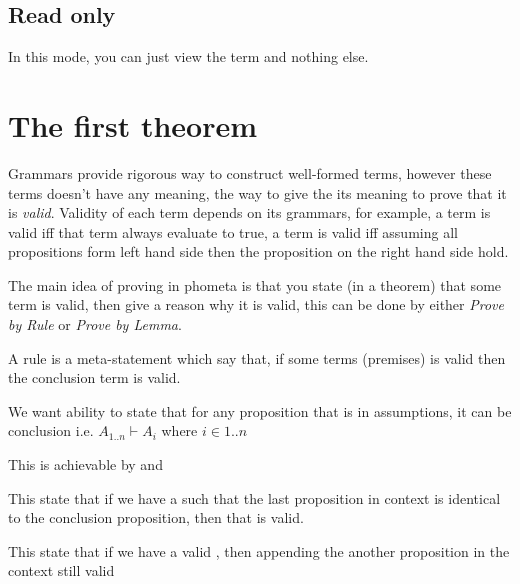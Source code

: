 \documentclass[master.tex]{subfiles}
\begin{document}
\subsection{Read only}
In this mode, you can just view the term and nothing else.

\section{The first theorem}

Grammars provide rigorous way to construct well-formed terms, however these
terms doesn't have any meaning, the way to give the its meaning to prove that it
is \emph{valid}. Validity of each term depends on its grammars, for example,
a  term is valid iff that term always evaluate to true, a
 term is valid iff assuming all propositions form left hand
side then the proposition on the right hand side hold.

The main idea of proving in phometa is that you state (in a theorem) that some
term is valid, then give a reason why it is valid, this can be done by either
\emph{Prove by Rule} or \emph{Prove by Lemma}.

A rule is a meta-statement which say that, if some terms (premises) is valid
then the conclusion term is valid.

We want ability to state that for any proposition that is in assumptions, it can
be conclusion i.e. $A_{1..n} \vdash A_i$ where $i \in {1..n}$

This is achievable by  and 


This state that if we have a  such that the last proposition in
context is identical to the conclusion proposition, then that 
is valid.


This state that if we have a valid , then appending the another
proposition in the context still valid
\end{document}
